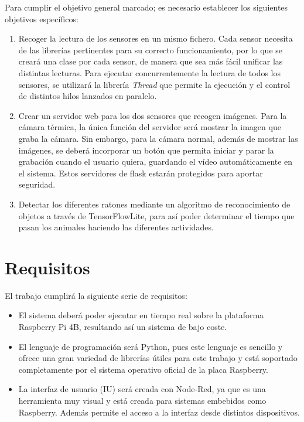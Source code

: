 Para cumplir el objetivo general marcado; es necesario establecer los siguientes objetivos específicos:
\begin{enumerate}
 \item Recoger la lectura de los sensores en un mismo fichero. Cada sensor necesita de las librerías pertinentes para su correcto funcionamiento, por lo que se creará una clase por cada sensor, de manera que sea más fácil unificar las distintas lecturas. Para ejecutar concurrentemente la lectura de todos los sensores, se utilizará la librería \textit{Thread} que permite la ejecución y el control de distintos hilos lanzados en paralelo.
 \item Crear un servidor web para los dos sensores que recogen imágenes. Para la cámara térmica, la única función del servidor será mostrar la imagen que graba la cámara. Sin embargo, para la cámara normal, además de mostrar las imágenes, se deberá incorporar un botón que permita iniciar y parar la grabación cuando el usuario quiera, guardando el vídeo automáticamente en el sistema. Estos servidores de flask estarán protegidos para aportar seguridad.
 \item Detectar los diferentes ratones mediante un algoritmo de reconocimiento de objetos a través de TensorFlowLite, para así poder determinar el tiempo que pasan los animales haciendo las diferentes actividades.
\end{enumerate}

\section{Requisitos}
\label{sec:requisitos}
El trabajo cumplirá la siguiente serie de requisitos:
\begin{itemize}
 \item El sistema deberá poder ejecutar en tiempo real sobre la plataforma Raspberry Pi 4B, resultando así un sistema de bajo coste.
 \item El lenguaje de programación será Python, pues este lenguaje es sencillo y ofrece una gran variedad de librerías útiles para este trabajo y está soportado completamente por el sistema operativo oficial de la placa Raspberry.
 \item La interfaz de usuario (IU) será creada con Node-Red, ya que es una herramienta muy visual y está creada para sistemas embebidos como Raspberry. Además permite el acceso a la interfaz desde distintos dispositivos.
\end{itemize}

